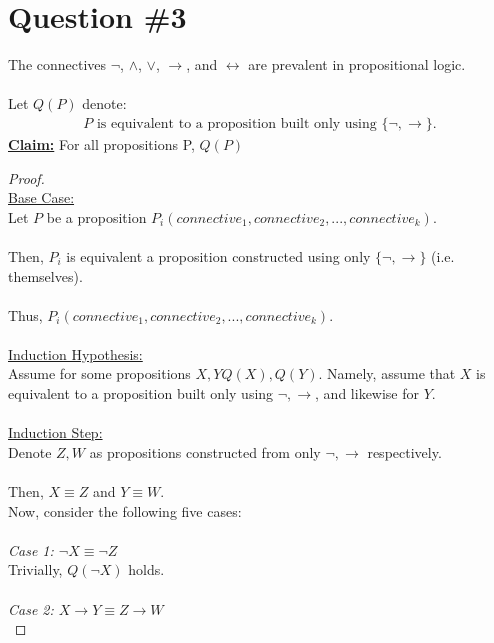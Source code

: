 \documentclass[12pt]{article}
\begin{document}
\section*{Question \#3}
The connectives $\neg$, $\land$, $\lor$, $\rightarrow$, and $\leftrightarrow$ are prevalent in propositional logic. \\
\\
Let $Q(P)$ denote:
\begin{equation*}
    \begin{aligned}
        \text{$P$ is equivalent to a proposition built only using $\{\neg, \rightarrow\}$.}
    \end{aligned}
\end{equation*}
\textbf{\underline{Claim:}} For all propositions P, $Q(P)$
\begin{proof}
\leavevmode\\
    \underline{Base Case:} \\
    Let $P$ be a proposition $P_i(connective_1, connective_2, ..., connective_k)$. \\
    \\
    Then, $P_i$ is equivalent a proposition constructed using only $\{\neg, \rightarrow\}$ (i.e. themselves). \\
    \\
    Thus, $P_i(connective_1, connective_2, ..., connective_k)$. \\
    \\
    \underline{Induction Hypothesis:} \\
    Assume for some propositions $X, Y Q(X), Q(Y)$. Namely, assume that $X$ is equivalent to a proposition built only using $\neg, \rightarrow$, and likewise for $Y$. \\
    \\
    \underline{Induction Step:} \\
    Denote $Z, W$ as propositions constructed from only $\neg, \rightarrow$ respectively. \\
    \\
    Then, $X \equiv Z$ and $Y \equiv W$. \\
    Now, consider the following five cases: \\
    \\
    \textit{Case 1: $\neg X  \equiv \neg Z$} \\
    Trivially, $Q(\neg X)$ holds. \\
    \\
    \textit{Case 2: $X \rightarrow Y \equiv Z \rightarrow W$} \\

\end{proof}
\end{document}
